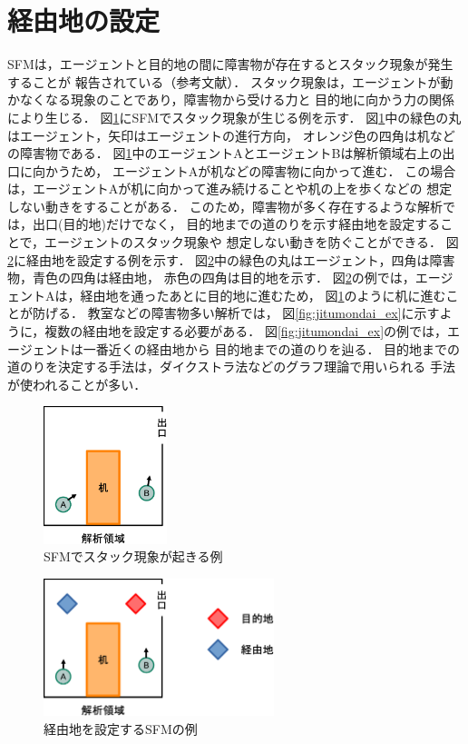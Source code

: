 \newpage
\section{経由地の設定}
SFMは，エージェントと目的地の間に障害物が存在するとスタック現象が発生することが
報告されている（参考文献）．
スタック現象は，エージェントが動かなくなる現象のことであり，障害物から受ける力と
目的地に向かう力の関係により生じる．
図\ref{fig:sutakku_ex}にSFMでスタック現象が生じる例を示す．
図\ref{fig:sutakku_ex}中の緑色の丸はエージェント，矢印はエージェントの進行方向，
オレンジ色の四角は机などの障害物である．
図\ref{fig:sutakku_ex}中のエージェントAとエージェントBは解析領域右上の出口に向かうため，
エージェントAが机などの障害物に向かって進む．
この場合は，エージェントAが机に向かって進み続けることや机の上を歩くなどの
想定しない動きをすることがある．
このため，障害物が多く存在するような解析では，出口(目的地)だけでなく，
目的地までの道のりを示す経由地を設定することで，エージェントのスタック現象や
想定しない動きを防ぐことができる．
図\ref{fig:keiyuti_ex}に経由地を設定する例を示す．
図\ref{fig:keiyuti_ex}中の緑色の丸はエージェント，四角は障害物，青色の四角は経由地，
赤色の四角は目的地を示す．
図\ref{fig:keiyuti_ex}の例では，エージェントAは，経由地を通ったあとに目的地に進むため，
図\ref{fig:sutakku_ex}のように机に進むことが防げる．
教室などの障害物多い解析では，
図\ref{fig:jitumondai_ex}に示すように，複数の経由地を設定する必要がある．
図\ref{fig:jitumondai_ex}の例では，エージェントは一番近くの経由地から
目的地までの道のりを辿る．
目的地までの道のりを決定する手法は，ダイクストラ法などのグラフ理論で用いられる
手法が使われることが多い\cite{keiro_daikusu}\cite{sfm_with_daikusutora}．

\begin{figure}[t]
 \begin{center}
  \includegraphics[height=4cm,clip]{figure/sutakku_ex.eps}
  \caption{SFMでスタック現象が起きる例}
  \label{fig:sutakku_ex}
 \end{center}
\end{figure}

\begin{figure}[t]
 \begin{center}
  \includegraphics[height=4cm,clip]{figure/keiyuti_ex.eps}
  \caption{経由地を設定するSFMの例}
  \label{fig:keiyuti_ex}
 \end{center}
\end{figure}


